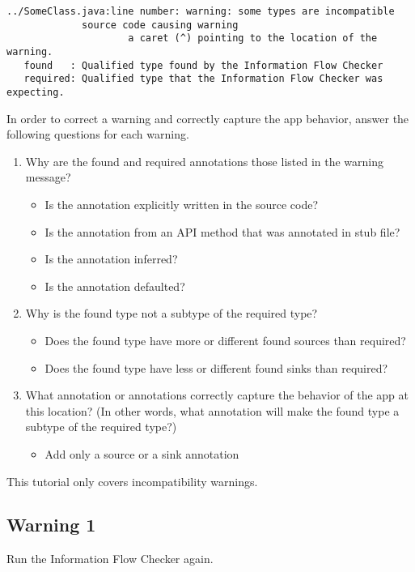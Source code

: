 \begin{Verbatim}  
../SomeClass.java:line number: warning: some types are incompatible 
             source code causing warning
                     a caret (^) pointing to the location of the warning.
   found   : Qualified type found by the Information Flow Checker
   required: Qualified type that the Information Flow Checker was expecting.
\end{Verbatim}
 
In order to correct a warning and correctly capture the app behavior, answer 
the following questions for each warning.
\begin{enumerate}
\item Why are the found and required annotations those listed in the warning message?
   \begin{itemize}
    \item Is the annotation explicitly written in the source code? 
    \item Is the annotation from an API method that was annotated in stub file? 
    \item Is the annotation inferred? 
    \item Is the annotation defaulted? 
    \end{itemize}
\item Why is the found type not a subtype of the required type? 
  \begin{itemize}
   \item Does the found type have more or different found sources than required?
   \item Does the found type have less or different found sinks than required? 
   \end{itemize}
\item What annotation or annotations correctly capture the behavior of the app at
  this location? (In other words, what annotation will make the found type a 
  subtype of the required type?)
   \begin{itemize}
   \item Add only a source or a sink annotation
   \end{itemize}
\end{enumerate}

This tutorial only covers incompatibility warnings.

\subsection{Warning 1}
Run the Information Flow Checker again.

